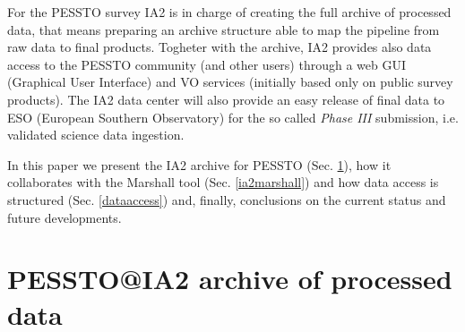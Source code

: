 \documentclass[11pt,twoside]{article}
\begin{document}
For the PESSTO survey IA2 is in charge of creating the full archive of processed data, that means preparing an archive structure able to map the pipeline from raw data to final products. Togheter with the archive, IA2 provides also data access to the PESSTO community (and other users) through a web GUI (Graphical User Interface) and VO services (initially based only on public survey products). The IA2 data center will also provide an easy release of final data to ESO (European Southern Observatory) for the so called \textit{Phase III} submission, i.e. validated science data ingestion.

In this paper we present the IA2 archive for PESSTO (Sec. \ref{ia2archive}), how it collaborates with the Marshall tool (Sec. \ref{ia2marshall}) and how data access is structured (Sec. \ref{dataaccess}) and, finally, conclusions on the current status and future developments.

\section{PESSTO@IA2 archive of processed data}\label{ia2archive}
\end{document}

